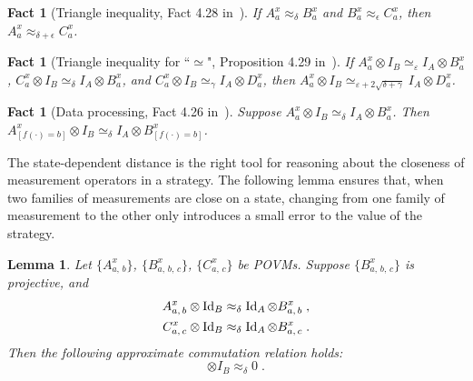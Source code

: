 \documentclass{book}
\theoremstyle{plain}
\newtheorem{lemma}[subsection]{Lemma}
\newtheorem{fact}[subsection]{Fact}
\theoremstyle{definition}
\theoremstyle{remark}
\numberwithin{equation}{subsection}
\newcommand{\eps}{\varepsilon}
\newcommand{\Id}{\ensuremath{\mathop{\rm Id}\nolimits}}
\newcommand{\alice}{A}
\newcommand{\bob}{B}
\newcommand{\abc}[1][\delta]{\otimes I_\bob \simeq_{#1} I_\alice \otimes}
\begin{document}
\begin{fact}[Triangle inequality, Fact 4.28 in~\cite{NW19}]
  \label{fact:triangle}
  If $A_a^x \approx_\delta B_a^x$ and $B_a^x \approx_\epsilon C_a^x$, then
  $A_a^x \approx_{\delta + \epsilon} C_a^x$.
\end{fact}

\begin{fact}[Triangle inequality for ``$\simeq$", Proposition 4.29 in~\cite{ML20}]
 \label{fact:triangle-for-simeq}
 If $A_a^x \otimes I_\bob \simeq_\eps I_\alice \otimes B_a^x$,
 $C_a^x \otimes I_\bob \simeq_\delta I_\alice \otimes  B_a^x$,
 and $C_a^x \otimes I_\bob \simeq_\gamma I_\alice \otimes  D_a^x$,
 then $A_a^x \otimes I_\bob \simeq_{\eps + 2\sqrt{\delta + \gamma}} I_\alice \otimes  D_a^x$.
\end{fact}

\begin{fact}[Data processing, Fact 4.26 in~\cite{NW19}]
  \label{fact:data-processing}
  Suppose $A^x_a \abc B^x_a$.
  Then $A^x_{[f(\cdot) = b]} \abc B^x_{[f(\cdot) = b]}$.
\end{fact}


The state-dependent distance is the right tool for reasoning about the closeness
of measurement operators in a strategy.
The following lemma ensures that, when two families of measurements are close on a
state, changing from one family of measurement to the other only introduces
a small error to the value of the strategy.

\begin{lemma}
  \label{lem:commutation-analysis}
  Let $\{A^x_{a,\, b}\}$, $\{B^x_{a,\, b,\, c}\}$, $\{C^x_{a,\, c}\}$ be POVMs.
  Suppose $\{B^x_{a,\, b,\, c}\}$ is projective, and
  \begin{align*}
    A^x_{a,\, b} \otimes \Id_\bob &\approx_\delta \Id_\alice \otimes B^x_{a,\, b}\;,\\
    C^x_{a,\, c} \otimes \Id_\bob &\approx_\delta \Id_\alice \otimes B^x_{a,\, c}\;.
  \end{align*}
  Then the following approximate commutation relation holds:
  \begin{equation*}
    [A^x_{a,\, b}, C^x_{a,\, c}] \otimes I_\bob \approx_\delta 0\;.
  \end{equation*}
\end{lemma}
\end{document}
